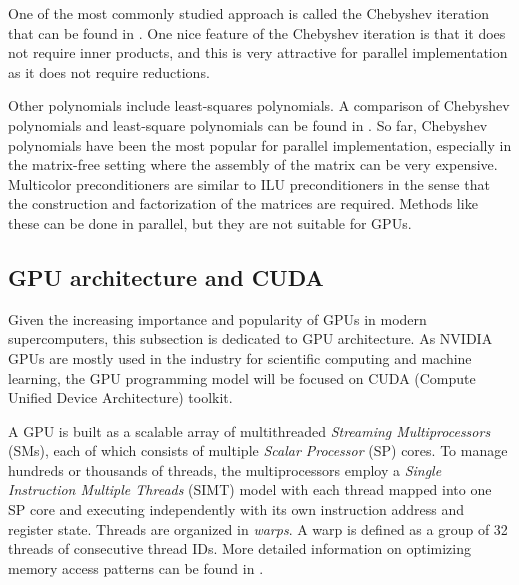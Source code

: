 One of the most commonly studied approach is called the Chebyshev iteration that can be found in \cite{doi:10.1137/1.9780898718003}. One nice feature of the Chebyshev iteration is that it does not require inner products, and this is very attractive for parallel implementation as it does not require reductions.

Other polynomials include least-squares polynomials. A comparison of Chebyshev polynomials and least-square polynomials can be found in \cite{ashby1992comparison}. So far, Chebyshev polynomials have been the most popular for parallel implementation, especially in the matrix-free setting where the assembly of the matrix can be very expensive.
Multicolor preconditioners are similar to ILU preconditioners in the sense that the construction and factorization of the matrices are required. Methods like these can be done in parallel, but they are not suitable for GPUs.

\subsection{GPU architecture and CUDA}
Given the increasing importance and popularity of GPUs in modern supercomputers, this subsection is dedicated to GPU architecture. As NVIDIA GPUs are mostly used in the industry for scientific computing and machine learning, the GPU programming model will be focused on CUDA (Compute Unified Device Architecture) toolkit.

A GPU is built as a scalable array of multithreaded \textit{Streaming Multiprocessors} (SMs), each of which consists of multiple \textit{Scalar Processor} (SP) cores. To manage hundreds or thousands of threads, the multiprocessors employ a \textit{Single Instruction Multiple Threads} (SIMT) model with each thread mapped into one SP core and executing independently with its own instruction address and register state.
Threads are organized in \textit{warps}. A warp is defined as a group of 32 threads of consecutive thread IDs. More detailed information on optimizing memory access patterns can be found in \cite{wilt2013cuda}.

